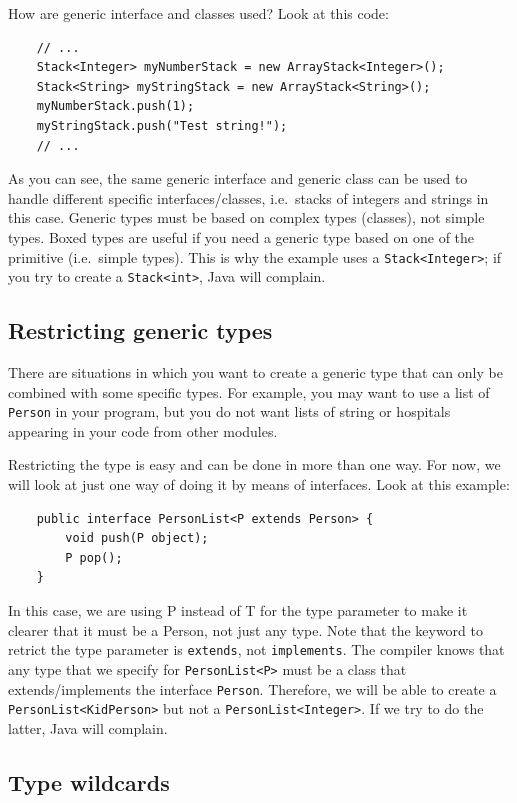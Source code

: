 How are generic interface and classes used? Look at this code:

\begin{verbatim}
    // ...
    Stack<Integer> myNumberStack = new ArrayStack<Integer>();
    Stack<String> myStringStack = new ArrayStack<String>();
    myNumberStack.push(1);
    myStringStack.push("Test string!");
    // ...
\end{verbatim}

As you can see, the same generic interface and generic class can be used to handle
different specific interfaces/classes, i.e.~stacks 
of integers and strings in this case. Generic types
must be based on complex types (classes), not simple types. Boxed
types are useful if you need a generic type based on one of the
primitive (i.e.~simple types). 
This is why the example uses a \verb+Stack<Integer>+; if you try
to create a \verb+Stack<int>+, Java will complain. 

\subsection{Restricting generic types}
\label{sec:restr-gener-types}

There are situations in which you want to create a generic type that
can only be combined with some specific types.
For example, you
may want to use a list of \verb+Person+ in your program, but you do
not want lists of string or hospitals appearing in your code from other
modules. 

Restricting the type is easy and can be done in more than one way. For
now, we will look at just one way of doing it by means of
interfaces. Look at this example:

\begin{verbatim}
    public interface PersonList<P extends Person> {
        void push(P object);
        P pop();
    }
\end{verbatim}

In this case, we are using P instead of T for the type parameter to
make it clearer that it must be a Person, not just any type. Note that
the keyword to retrict the type parameter is \verb+extends+, not
\verb+implements+. The
compiler knows that any type that we specify for \verb+PersonList<P>+
must be a class that extends/implements the interface \verb+Person+. Therefore, we will be
able to create a \verb+PersonList<KidPerson>+ but not a
\verb+PersonList<Integer>+. If we try to do the latter, Java will
complain. 

\subsection{Type wildcards}
\label{sec:type-wildcards}

